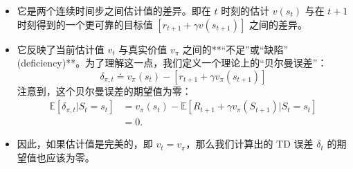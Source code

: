 \documentclass{article}
\begin{document}
\begin{itemize}
    \item 它是两个连续时间步之间估计值的差异。即在 $t$ 时刻的估计 $v(s_t)$ 与在 $t+1$ 时刻得到的一个更可靠的目标值 $[r_{t+1} + \gamma v(s_{t+1})]$ 之间的差异。
    
    \item 它反映了当前估计值 $v_t$ 与真实价值 $v_{\pi}$ 之间的**“不足”或“缺陷” (deficiency)**。为了理解这一点，我们定义一个理论上的“贝尔曼误差”：
    \[
    \delta_{\pi,t} \doteq v_{\pi}(s_t) - [r_{t+1} + \gamma v_{\pi}(s_{t+1})]
    \]
    注意到，这个贝尔曼误差的期望值为零：
    \begin{align*}
        \mathbb{E}[\delta_{\pi,t} | S_t = s_t] &= v_{\pi}(s_t) - \mathbb{E}[R_{t+1} + \gamma v_{\pi}(S_{t+1}) | S_t = s_t] \\
        &= 0.
    \end{align*}
    
    \item 因此，如果估计值是完美的，即 $v_t = v_{\pi}$，那么我们计算出的 TD 误差 $\delta_t$ 的期望值也应该为零。
\end{itemize}
\end{document}
